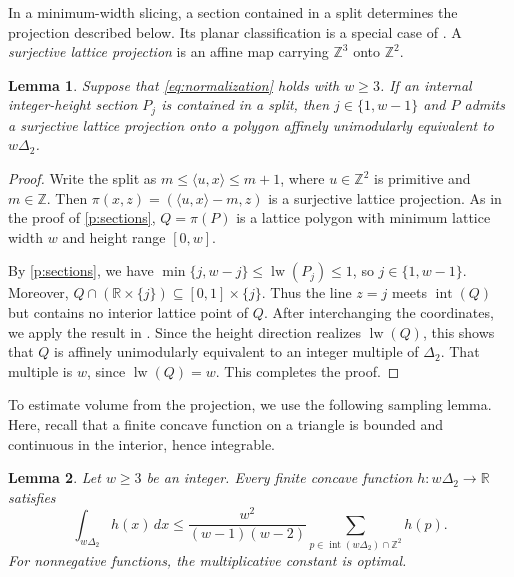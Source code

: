 \documentclass[reqno, 11pt]{article}
\numberwithin{equation}{section}
\newtheorem{lemma}[lemma]{Lemma}
\theoremstyle{definition}
\newcommand{\R}{\mathbb R}
\newcommand{\Z}{\mathbb Z}
\DeclareMathOperator{\Int}{int}
\DeclareMathOperator{\lw}{lw}
\numberwithin{equation}{section}
\begin{document}
In a minimum-width slicing, a section contained in a split determines the projection described below. 
Its planar classification is a special case of \cite[Lemma~4.3]{Bohnert2023}. 
A \emph{surjective lattice projection} is an affine map carrying $\Z^3$ onto $\Z^2$.

\begin{lemma}\label{pr:projection}
Suppose that \eqref{eq:normalization} holds with $w\ge3$. If an internal integer-height section $P_j$ is contained in a split, then
$j\in\{1,w-1\}$ and $P$ admits a surjective lattice projection onto a polygon affinely unimodularly equivalent to $w\Delta_2$.
\end{lemma}

\begin{proof}
Write the split as $m\le\langle u,x\rangle\le m+1$,
where $u\in\Z^2$ is primitive and $m\in\Z$. Then
$\pi(x,z)=(\langle u,x\rangle-m,z)$ is a surjective
lattice projection. As in the proof of \cref{p:sections},
$Q=\pi(P)$ is a lattice polygon with minimum lattice
width $w$ and height range $[0,w]$.

By \cref{p:sections}, we have $\min\{j,w-j\}\le\lw(P_j)\le1$, so $j\in\{1,w-1\}$.
Moreover, $Q\cap(\R\times\{j\})\subseteq[0,1]\times\{j\}$.
Thus the line $z=j$ meets $\Int(Q)$ but contains no interior lattice point of $Q$. 
After interchanging the coordinates, we apply the result in \cite[Lemma~4.3]{Bohnert2023}. Since the height direction realizes $\lw(Q)$, this shows that $Q$ is affinely unimodularly equivalent to an integer multiple of $\Delta_2$.
That multiple is $w$, since $\lw(Q)=w$.
This completes the proof.
\end{proof}


To estimate volume from the projection, we use the following sampling lemma. Here, recall that a finite concave function on a triangle is bounded and continuous in the interior, hence integrable.

\begin{lemma}\label{pr:sampling}
Let $w\ge3$ be an integer. Every finite concave function
$h:w\Delta_2\to\R$ satisfies
\begin{equation}\label{eq:triangle-sampling}
 \int_{w\Delta_2}h(x)\,dx\le \frac{w^2}{(w-1)(w-2)} \sum_{p\in\Int(w\Delta_2)\cap\Z^2}h(p).
\end{equation}
For nonnegative functions, the multiplicative constant is optimal.
\end{lemma}
\end{document}
